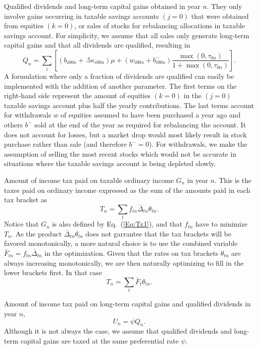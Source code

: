 \documentclass{article}[fleqn,12pt]
\begin{document}
\begin{description}[leftmargin=4em,style=multiline]
\item [$Q_n$]
	Qualified dividends and long-term capital gains obtained in year $n$.
	They only involve gains occurring in taxable savings accounts $(j=0)$ that
	were obtained from equities $(k=0)$, or sales of stocks for rebalancing allocations
	in taxable savings account.
	For simplicity, we assume that all sales only generate long-term capital gains and
	that all dividends are qualified, resulting in
	\begin{equation}
		\label{Eq:Qx2}
		Q_n = \sum_{i} \left[(b_{i00n} + .5\kappa_{i00n})\mu +
		(w_{i00n} + b^-_{i00n})\frac{\max(0, \tau_{0n})}{1 + \max(0, \tau_{0n})}\right].
	\end{equation}
	A formulation where only a fraction of dividends are qualified can easily be
	implemented with the addition of another parameter.
	The first terms on the right-hand side represent the amount of equities $(k=0)$ in the $(j=0)$
	taxable savings account plus
	half the yearly contributions. The last terms account for withdrawals $w$ of equities assumed
	to have been purchased a year ago and others $b^-$ sold at the end
	of the year as required for rebalancing the account. It does not account for losses, but a market drop
	would most likely result in stock purchase rather than sale (and therefore $b^- = 0$).
	For withdrawals, we make the assumption of
	selling the most recent stocks which would not be accurate in situations where
	the taxable savings account is being depleted slowly.
\item [$T_n$]
	Amount of income tax paid on taxable ordinary income $G_n$ in year $n$.
	This is the taxes paid on ordinary income expressed as the sum of the amounts
	paid in each tax bracket as
	\begin{equation}
		\label{Eq:Tax}
		T_n = \sum_t f_{tn}\bar{\Delta}_{tn}\theta_{tn}.
	\end{equation}
	Notice that $G_n$ is also defined by Eq.~(\ref{Eq:Tx1}), and that $f_{tn}$ have to
	minimize $T_n$.
	As the product $\bar{\Delta}_{tn}\theta_{tn}$ does not garrantee that the tax brackets
	will be favored monotonically, a more natural choice is to use the combined variable
	$\bar{F}_{tn} = f_{tn}\bar{\Delta}_{tn}$ in the optimization. Given that the rates on
	tax brackets $\theta_{tn}$ are always increasing monotonically, we are then naturally
	optimizing to fill in the lower brackets first. In that case
		\begin{equation}
			T_n = \sum_t \bar{F}_t \theta_{tn}.
		\end{equation}
\item [$U_n$]
	Amount of income tax paid on long-term capital gains and qualified dividends in year $n$,
	\begin{equation}
		U_n = \psi Q_n.
	\end{equation}
	Although it is not always the case, we assume that qualified dividends and long-term
	capital gains are taxed at the same preferential rate $\psi$.
\end{description}
\end{document}
